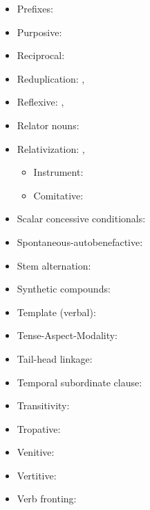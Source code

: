 \documentclass[oldfontcommands,oneside,a4paper,11pt]{article}
\begin{document}
\begin{itemize}
\item Prefixes: \citet[196-199]{jacques13harmonization}
\item Purposive:  \citet[306-8]{jacques14linking}
\item Reciprocal: \citet[212]{jacques12demotion}
\item Reduplication: \citet{jacques04these}, \citet{jacques07redupl}
\item Reflexive: \citet{jacques10refl}, \citet[85]{jacques12agreement}
\item Relator nouns:  \citet[274-6]{jacques14linking}
\item Relativization: \citet{jacques08}, \citet{jacques16sketch}
\begin{itemize}
\item Instrument: \citet{jacques15comparative}
\item Comitative: \citet[272-4]{jacques14linking}
\end{itemize}
\item Scalar concessive conditionals: \citet[300]{jacques14linking}
\item Spontaneous-autobenefactive: \citet{jacques15spontaneous}
\item Stem alternation:  \citet[267]{jacques14linking}
\item Synthetic compounds: \citet[1220-3]{jacques12incorp}
\item Template (verbal): \citet[196-199]{jacques13harmonization}
\item Tense-Aspect-Modality:  \citet[265-9]{jacques14linking}
\item Tail-head linkage:  \citet[279-280]{jacques14linking}
\item Temporal subordinate clause:  \citet[281-295]{jacques14linking}
\item Transitivity: \citet[9-10]{jacques14antipassive}
\item Tropative: \citet{jacques13tropative}
\item Venitive: \citet[200-6]{jacques13harmonization}
\item Vertitive:  \citet{jacques15spontaneous}
\item Verb fronting:  \citet[280]{jacques14linking}
\end{itemize}



\end{document}
